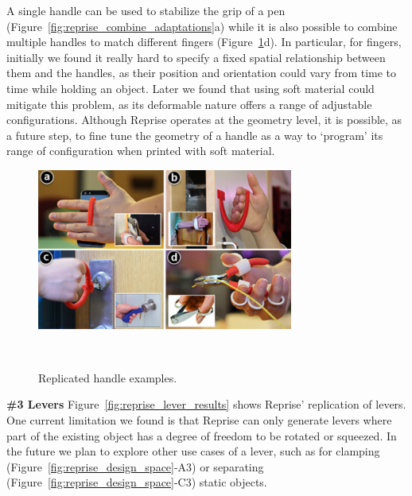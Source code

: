 A single handle can be used to stabilize the grip of a pen (Figure~\ref{fig:reprise_combine_adaptations}a) while it is also possible to combine multiple handles to match different fingers (Figure~\ref{fig:reprise_handle_results}d). In particular, for fingers, initially we found it really hard to specify a fixed spatial relationship between them and the handles, as their position and orientation could vary from time to time while holding an object. Later we found that using soft material could mitigate this problem, as its deformable nature offers a range of adjustable configurations. Although Reprise operates at the geometry level, it is possible, as a future step, to fine tune the geometry of a handle as a way to `program' its range of configuration when printed with soft material.
\vskip 5pt


\begin{figure}[h!]
  \centering
  \includegraphics[width=0.75\textwidth]{figures/reprise_handle_results_v1.pdf}
  \caption{Replicated handle examples.}~\label{fig:reprise_handle_results}
\end{figure}

\textbf{\#3 Levers}
Figure~\ref{fig:reprise_lever_results} shows Reprise' replication of levers. One current limitation we found is that Reprise can only generate levers where part of the existing object has a degree of freedom to be rotated or squeezed. In the future we plan to explore other use cases of a lever, such as for clamping (Figure~\ref{fig:reprise_design_space}-A3) or separating (Figure~\ref{fig:reprise_design_space}-C3) static objects.
\vskip 3pt

